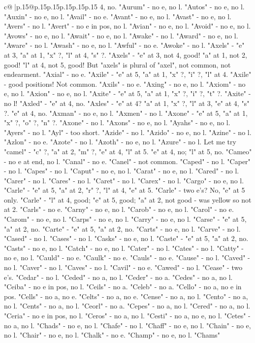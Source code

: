 \documentclass{article}
\begin{document}
{\begin{supertabular}{c@{$\;$}|p{.15\linewidth}@{}p{.15\linewidth}p{.15\linewidth}p{.15\linewidth}p{.15\linewidth}p{.15\linewidth}}
{{{4, no. "Aurum" {-} no e, no l. "Autos" {-} no e, no l. "Auxin" {-} no e, no l. "Avail" {-} no e. "Avant" {-} no e, no l. "Avast" {-} no e, no l. "Avers" {-} no l. "Avert" {-} no e in pos, no l. "Avian" {-} no e, no l. "Avoid" {-} no e, no l. "Avows" {-} no e, no l. "Await" {-} no e, no l. "Awake" {-} no l. "Award" {-} no e, no l. "Aware" {-} no l. "Awash" {-} no e, no l. "Awful" {-} no e. "Awoke" {-} no l. "Axels" {-} "e" at 3, "a" at 1, "x" ?, "l" at 4, "s" ?. "Axels" {-} "e" at 3, not 4, good! "a" at 1, not 2, good! "l" at 4, not 5, good! But "axels" is plural of "axel", not common, not endearment. "Axial" {-} no e. "Axile" {-} "e" at 5, "a" at 1, "x" ?, "i" ?, "l" at 4. "Axile" {-} good positions! Not common. "Axils" {-} no e. "Axing" {-} no e, no l. "Axiom" {-} no e, no l. "Axion" {-} no e, no l. "Axite" {-} "e" at 5, "a" at 1, "x" ?, "i" ?, "t" ?. "Axite" {-} no l! "Axled" {-} "e" at 4, no. "Axles" {-} "e" at 4? "a" at 1, "x" ?, "l" at 3, "e" at 4, "s" ?. "e" at 4, no. "Axman" {-} no e, no l. "Axmen" {-} no l. "Axone" {-} "e" at 5, "a" at 1, "x" ?, "o" ?, "n" ?. "Axone" {-} no l. "Axons" {-} no e, no l. "Ayahs" {-} no e, no l. "Ayers" {-} no l. "Ayl" {-} too short. "Azide" {-} no l. "Azido" {-} no e, no l. "Azine" {-} no l. "Azlon" {-} no e. "Azote" {-} no l. "Azoth" {-} no e, no l. "Azure" {-} no l. Let me try "camel" {-} "c" ?, "a" at 2, "m" ?, "e" at 4, "l" at 5. "e" at 4, no; "l" at 5, no. "Cameo" {-} no e at end, no l. "Canal" {-} no e. "Canel" {-} not common. "Caped" {-} no l. "Caper" {-} no l. "Capes" {-} no l. "Caput" {-} no e, no l. "Carat" {-} no e, no l. "Cared" {-} no l. "Carer" {-} no l. "Cares" {-} no l. "Caret" {-} no l. "Carex" {-} no l. "Cargo" {-} no e, no l. "Carle" {-} "e" at 5, "a" at 2, "r" ?, "l" at 4, "e" at 5. "Carle" {-} two e's? No, "e" at 5 only. "Carle" {-} "l" at 4, good; "e" at 5, good; "a" at 2, not good {-} was yellow so not at 2. "Carls" {-} no e. "Carny" {-} no e, no l. "Carob" {-} no e, no l. "Carol" {-} no e. "Carom" {-} no e, no l. "Carps" {-} no e, no l. "Carry" {-} no e, no l. "Carse" {-} "e" at 5, "a" at 2, no. "Carte" {-} "e" at 5, "a" at 2, no. "Carts" {-} no e, no l. "Carve" {-} no l. "Cased" {-} no l. "Cases" {-} no l. "Casks" {-} no e, no l. "Caste" {-} "e" at 5, "a" at 2, no. "Casts" {-} no e, no l. "Catch" {-} no e, no l. "Cater" {-} no l. "Cates" {-} no l. "Catty" {-} no e, no l. "Cauld" {-} no e. "Caulk" {-} no e. "Cauls" {-} no e. "Cause" {-} no l. "Caved" {-} no l. "Caver" {-} no l. "Caves" {-} no l. "Cavil" {-} no e. "Cawed" {-} no l. "Cease" {-} two e's. "Cedar" {-} no l. "Ceded" {-} no a, no l. "Ceder" {-} no a. "Cedes" {-} no a, no l. "Ceiba" {-} no e in pos, no l. "Ceils" {-} no a. "Celeb" {-} no a. "Cello" {-} no a, no e in pos. "Cells" {-} no a, no e. "Celts" {-} no a, no e. "Cense" {-} no a, no l. "Cento" {-} no a, no l. "Cents" {-} no a, no l. "Ceorl" {-} no a. "Cepes" {-} no a, no l. "Cered" {-} no a, no l. "Ceria" {-} no e in pos, no l. "Ceros" {-} no a, no l. "Cesti" {-} no a, no e, no l. "Cetes" {-} no a, no l. "Chads" {-} no e, no l. "Chafe" {-} no l. "Chaff" {-} no e, no l. "Chain" {-} no e, no l. "Chair" {-} no e, no l. "Chalk" {-} no e. "Champ" {-} no e, no l. "Chams" }}}
\end{supertabular}}
\end{document}
